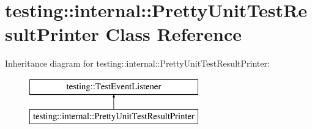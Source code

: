 \hypertarget{classtesting_1_1internal_1_1_pretty_unit_test_result_printer}{}\section{testing\+:\+:internal\+:\+:Pretty\+Unit\+Test\+Result\+Printer Class Reference}
\label{classtesting_1_1internal_1_1_pretty_unit_test_result_printer}
Inheritance diagram for testing\+:\+:internal\+:\+:Pretty\+Unit\+Test\+Result\+Printer\+:\begin{figure}[H]
\begin{center}
\leavevmode
\includegraphics[height=2.000000cm]{classtesting_1_1internal_1_1_pretty_unit_test_result_printer}
\end{center}
\end{figure}
